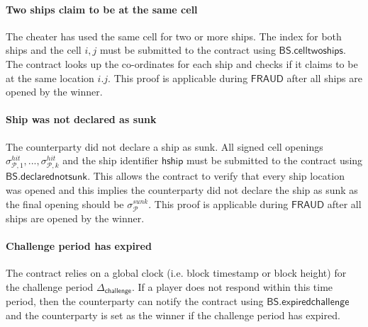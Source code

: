 \documentclass{llncs}
\newcommand{\gamefraud}{\mathsf{FRAUD}}
\newcommand{\hship}{\mathsf{hship}}
\newcommand{\participant}{\mathcal{P}}
\newcommand{\battleshipdeclarednotsunk}{\mathsf{BS.declarednotsunk}}
\newcommand{\battleshiptwoships}{\mathsf{BS.celltwoships}}
\newcommand{\battleshipchallengeexpired}{\mathsf{BS.expiredchallenge}}
\newcommand{\timerchallenge}{\mathsf{\Delta}_{\mathsf{challenge}}}
\begin{document}


\paragraph{Two ships claim to be at  the same cell} 
The cheater has used the same cell for two or more ships.  
The index for both ships and the cell $i,j$ must be submitted to the contract using $\battleshiptwoships$. 
The contract looks up the co-ordinates for each ship and checks if it claims to be at the same location $i.j$.
This proof is applicable during $\gamefraud$ after all ships are opened by the winner. 

\paragraph{Ship was not declared as sunk}
The counterparty did not declare a ship as sunk. 
All signed cell openings $\sigma^{hit}_{\participant,1},...,\sigma^{hit}_{\participant,k}$ and the ship identifier $\hship$ must be submitted to the contract using $\battleshipdeclarednotsunk$. 
This allows the contract to verify that every ship location was opened and this implies the counterparty did not declare the ship as sunk as the final opening should be $\sigma^{sunk}_{\participant}$. 
This proof is applicable during $\gamefraud$ after all ships are opened by the winner. 

\paragraph{Challenge period has expired }
The contract relies on a global clock (i.e. block timestamp or block height) for the challenge period  $\timerchallenge$. 
If a player does not respond within this time period, then the counterparty can notify the contract using $\battleshipchallengeexpired$ and the counterparty is set as the winner if the challenge period has expired. 
\end{document}
